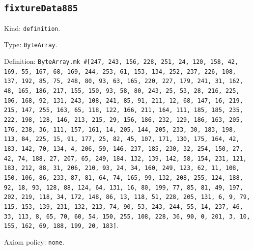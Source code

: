\documentclass[11pt]{article}
\begin{document}
\subsection*{\texttt{fixtureData885}}
\noindent Kind: \texttt{definition}.\par
\noindent Type: \texttt{ByteArray}.\par
\noindent Definition: \texttt{ByteArray.mk \#[247, 243, 156, 228, 251, 24, 120, 158, 42, 169, 55, 167, 68, 169, 244, 253, 61, 153, 134, 252, 237, 226, 108, 137, 192, 85, 75, 248, 80, 93, 63, 165, 220, 227, 179, 241, 31, 162, 48, 165, 186, 217, 155, 150, 93, 58, 80, 243, 25, 53, 28, 216, 225, 106, 168, 92, 131, 243, 108, 241, 85, 91, 211, 12, 68, 147, 16, 219, 215, 147, 255, 163, 65, 118, 122, 166, 211, 164, 111, 185, 185, 235, 222, 198, 128, 146, 213, 215, 29, 156, 186, 232, 129, 186, 163, 205, 176, 238, 36, 111, 157, 161, 14, 205, 144, 205, 233, 30, 183, 198, 113, 84, 225, 15, 91, 177, 25, 82, 45, 107, 171, 130, 175, 164, 42, 183, 142, 70, 134, 4, 206, 59, 146, 237, 185, 230, 32, 254, 150, 27, 42, 74, 188, 27, 207, 65, 249, 184, 132, 139, 142, 58, 154, 231, 121, 183, 212, 88, 31, 206, 210, 93, 24, 34, 160, 249, 123, 62, 11, 108, 150, 106, 86, 233, 87, 81, 64, 74, 165, 99, 132, 208, 255, 124, 188, 92, 18, 93, 128, 88, 124, 64, 131, 16, 80, 199, 77, 85, 81, 49, 197, 202, 219, 118, 34, 172, 148, 86, 13, 118, 51, 228, 205, 131, 6, 9, 79, 115, 153, 139, 231, 132, 213, 74, 90, 53, 243, 244, 55, 14, 237, 46, 33, 113, 8, 65, 70, 60, 54, 150, 255, 108, 228, 36, 90, 0, 201, 3, 10, 155, 162, 69, 188, 199, 20, 183]}.\par
\noindent Axiom policy: \texttt{none}.\par
\end{document}

